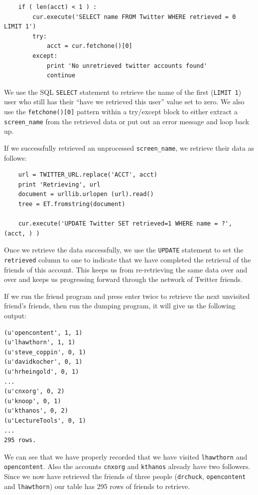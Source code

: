 \documentclass[11pt]{book}
\begin{document}
\beforeverb
\begin{verbatim}
    if ( len(acct) < 1 ) :
        cur.execute('SELECT name FROM Twitter WHERE retrieved = 0 LIMIT 1')
        try:
            acct = cur.fetchone()[0]
        except:
            print 'No unretrieved twitter accounts found'
            continue
\end{verbatim}
\afterverb
%
We use the SQL {\tt SELECT} statement to retrieve the name of the first 
({\tt LIMIT 1}) user who still has their ``have we retrieved this user''
value set to zero.  We also use the {\tt fetchone()[0]} pattern within 
a try/except block to either extract a \verb"screen_name" from the retrieved
data or put out an error message and loop back up.

If we successfully retrieved an unprocessed \verb"screen_name", we retrieve
their data as follows:

\beforeverb
\begin{verbatim}
    url = TWITTER_URL.replace('ACCT', acct)
    print 'Retrieving', url
    document = urllib.urlopen (url).read()
    tree = ET.fromstring(document)

    cur.execute('UPDATE Twitter SET retrieved=1 WHERE name = ?', (acct, ) )
\end{verbatim}
\afterverb
%
Once we retrieve the data successfully, we use the {\tt UPDATE} statement 
to set the {\tt retrieved} column to one to indicate that we have completed 
the retrieval of the friends of this account.  This keeps us from re-retrieving
the same data over and over and keeps us progressing forward through the network
of Twitter friends.

If we run the friend program and press enter twice to retrieve the next 
unvisited friend's friends,
then run the dumping program, it will give us the following output:

\beforeverb
\begin{verbatim}
(u'opencontent', 1, 1)
(u'lhawthorn', 1, 1)
(u'steve_coppin', 0, 1)
(u'davidkocher', 0, 1)
(u'hrheingold', 0, 1)
...
(u'cnxorg', 0, 2)
(u'knoop', 0, 1)
(u'kthanos', 0, 2)
(u'LectureTools', 0, 1)
...
295 rows.
\end{verbatim}
\afterverb
%
We can see that we have properly recorded that we have visited 
{\tt lhawthorn} and {\tt opencontent}.  Also the accounts 
{\tt cnxorg} and {\tt kthanos} already have two followers.
Since we now have retrieved the friends of three people
({\tt drchuck}, {\tt opencontent} and {\tt lhawthorn}) our table has 295 rows 
of friends to retrieve.
\end{document}
